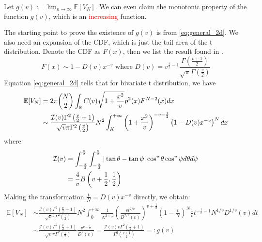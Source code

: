 \documentclass{article}
\def\E{\mathbb{E}}
\def\R{\mathbb{R}}
\begin{document}
Let $g(v):=\lim_{n \to \infty} \E[V_N]$. We can even claim the monotonic property
of the function $g(v)$, which is an \textcolor{red}{increasing}
function.

The starting point to prove the existence of $g(v)$ 
is from \eqref{eq:general_2d}.
We also need an expansion of the CDF, which is just the tail area
of the t distribution. Denote the CDF as $F(x)$, then we list the result found in \cite{andrew1976}.
\begin{equation} \label{eq:eq_dv}
    F(x) \sim 1 - D(v)x^{-v} \textrm{ where } D(v)
    =v^{\frac{v}{2}-1} \frac{\Gamma \left(\frac{v+1}{2} \right)}
    {\sqrt{\pi} \Gamma\left(\frac{v}{2}\right)}
\end{equation}
Equation \eqref{eq:general_2d} tells that for bivariate t distribution,
we have
\begin{align}
    \E[V_N] & = 2\pi \binom{N}{2} \int_{\R}
    C(v) \sqrt{1+\frac{x^2}{v}} p^2(x)F^{N-2}(x)dx
    \notag \\
    &\sim \frac{ \mathcal{I}(v)\Gamma^2 \left(\frac{v}{2} +1\right) }
    {\sqrt{v}\pi
    \Gamma^2\left(\frac{v}{2}\right)}  N^2
    \int_{K}^{+\infty} \left(1+\frac{x^2}{v}\right)^{-v-\frac{1}{2}}
    \left(1-D(v)x^{-v} \right)^N dx
    \label{eq:v2bivariate_t_dis}
\end{align}
where
\begin{align}
    \mathcal{I}(v) &= \int_{-\frac{\pi}{2}}^{\frac{\pi}{2}}
    \int_{-\frac{\pi}{2}}^{\frac{\pi}{2}}
    |\tan \theta - \tan \psi|
    \cos^v\theta \cos^v \psi
    d\theta d\psi \notag\\
    &= \frac{4}{v} B\left(v+\frac{1}{2}, \frac{1}{2}
    \right)\label{eq:I_v_analytical}
\end{align}
Making the transformation $\frac{t}{N}=D(v)x^{-v}$
directly, we obtain:
\begin{align}
    \E[V_N] &\sim
    \frac{ \mathcal{I}(v)
    \Gamma^2 \left(\frac{v}{2} +1\right) }
    {\sqrt{v}\pi
    \Gamma^2\left(\frac{v}{2}\right)}  N^2
    \int_{0}^{+\infty} \frac{1}{N^{2+\frac{1}{v}}}\left(\frac{vt^{2/v}}{D^{2/v}(v)}\right)^{v+\frac{1}{2}}
    \left(1- \frac{t}{N} \right)^N \frac{1}{v} t^{-\frac{1}{v}-1} N^{1/v} D^{1/v}(v)dt
    \label{eq:EV_N_general}    \\
    &\sim \frac{ \mathcal{I}(v)
    \Gamma^2 \left(\frac{v}{2} +1\right) }
    {\sqrt{v}\pi
    \Gamma^2\left(\frac{v}{2}\right)} \frac{v^{v-\frac{1}{2}}}
    {D^2(v)} = \frac{\mathcal{I}(v) v \Gamma^2\left(\frac{v}{2}+1\right)}
    {\Gamma^2 \left(\frac{v+1}{2} \right)} 
    =: g(v) \label{eq:E_V_N_v_v_12_D}
\end{align}
\end{document}

